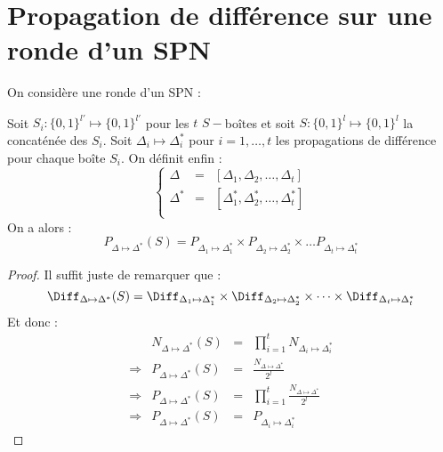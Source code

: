 \documentclass[a4paper, 10pt]{thesis}
\begin{document}
\section{Propagation de différence sur une ronde d'un SPN}

On considère une ronde d'un SPN :


\begin{pr}
    Soit $S_i : \{0, 1\}^{l'} \mapsto \{0, 1\}^{l'}$ pour les $t$ $S-$boîtes et soit $S : \{0, 1\}^l
    \mapsto \{0, 1\}^l$ la concaténée des $S_i$. Soit $\Delta_i \mapsto \Delta_i^*$ pour $i = 1,
    \dots, t$ les propagations de différence pour chaque boîte $S_i$. On définit enfin :
    \begin{displaymath}
        \left \lbrace
        \begin{array}{ccc}
            \Delta & = & [\Delta_1, \Delta_2, \dots, \Delta_t] \\
            \Delta^* & = & [\Delta_1^*, \Delta_2^*, \dots, \Delta_t^*] \\
        \end{array}
        \right .
    \end{displaymath}
    On a alors : \begin{displaymath}
        P_{\Delta \mapsto \Delta^*}(S) = P_{\Delta_1 \mapsto \Delta_1^*} \times P_{\Delta_2 \mapsto
        \Delta_2^*} \times \dots P_{\Delta_t \mapsto \Delta_t^*} 
    \end{displaymath}
\end{pr}

\begin{proof}
    Il suffit juste de remarquer que : \begin{displaymath}
        \Diff_{\Delta \mapsto \Delta^*} (S) = \Diff_{\Delta_1 \mapsto \Delta_1^*} \times
        \Diff_{\Delta_2 \mapsto \Delta_2^*} \times \dots \times \Diff_{\Delta_t \mapsto \Delta_t^*} 
    \end{displaymath}
    Et donc :
    \begin{displaymath}
        \begin{array}{rrcl}
            & N_{\Delta \mapsto \Delta^*}(S) & = & \prod_{i=1}^t N_{\Delta_i \mapsto \Delta_i^*}\\
            \Rightarrow & P_{\Delta \mapsto \Delta^*}(S) & = & \displaystyle \frac{N_{\Delta \mapsto
    \Delta^*}}{2^l} \\
    \Rightarrow &  P_{\Delta \mapsto \Delta^*}(S) & = & \displaystyle \prod_{i=1}^t \frac{N_{\Delta \mapsto
\Delta^*}}{2^l} \\
    \Rightarrow & P_{\Delta \mapsto \Delta^*}(S) & = & P_{\Delta_i \mapsto \Delta_i^*}
        \end{array}
    \end{displaymath}
\end{proof}
\end{document}
